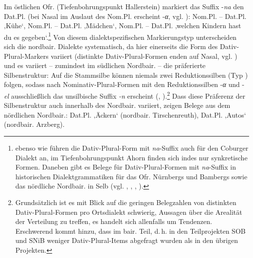 Im östlichen Ofr. (Tiefenbohrungspunkt Hallerstein) markiert das Suffix -\textit{na} den Dat.Pl. (bei Nasal im Auslaut des Nom.Pl. erscheint -\textit{α}, vgl. \citealt[139]{Rowley1997}): Nom.Pl.  -- Dat.Pl.   ‚Kühe‘, Nom.Pl.  -- Dat.Pl.    ‚Mädchen‘, Nom.Pl.   -- Dat.Pl.      ‚welchen Kindern hast du es gegeben‘.\footnote{\citet[139]{Rowley1997} ebenso wie \citet[177]{Hermann1957} führen die Dativ-Plural-Form mit \textit{na}{}-Suffix auch für den Coburger Dialekt an, im Tiefenbohrungspunkt Ahorn finden sich indes nur synkretische Formen. Daneben gibt es Belege für Dativ-Plural-Formen mit \textit{na}{}-Suffix in historischen Dialektgrammatiken für das Ofr. Nürnbergs und Bambergs sowie das nördliche Nordbair. in Selb \textrm{(vgl. \citealt[§11]{Frommann1857}, \citealt[322--323]{Franke1895}, \citealt[262]{Schübel1955}, \citealt[32]{Vogt1930}).}} Von diesem dialektspezifischen Markierungstyp unterscheiden sich die nordbair. Dialekte systematisch, da hier einerseits die Form des Dativ-Plural-Markers variiert (distinkte Dativ-Plural-Formen enden auf Nasal, vgl. \citealt[139]{Rowley1997}) und es variiert -- zumindest im südlichen Nordbair. -- die präferierte Silbenstruktur: Auf die Stammsilbe können niemals zwei Reduktionssilben (Typ ) folgen, sodass nach Nominativ-Plural-Formen mit den Reduktionssilben -\textit{α} und -\textit{el} ausschließlich das unsilbische Suffix \textit{{}-n} erscheint (\citealt[§147.2a]{Kollmer1987}, \citealt[140]{Rowley1997}).\footnote{Grundsätzlich ist es mit Blick auf die geringen Belegzahlen von distinkten Dativ-Plural-Formen pro Ortsdialekt schwierig, Aussagen über die Arealität der Verteilung zu treffen, es handelt sich allenfalls um Tendenzen. Erschwerend kommt hinzu, dass im bair. Teil, d.\,h. in den Teilprojekten SOB und SNiB weniger Dativ-Plural-Items abgefragt wurden als in den übrigen Projekten.} Dass diese Präferenz der Silbenstruktur auch innerhalb des Nordbair. variiert, zeigen  Belege aus dem nördlichen Nordbair.: Dat.Pl.  ‚Äckern‘ (nordbair. Tirschenreuth), Dat.Pl.  ‚Autos‘ (nordbair. Arzberg).\largerpage[2]


